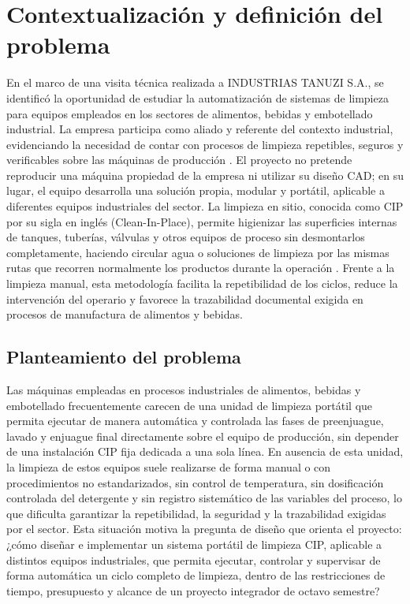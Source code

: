 \section{Contextualización y definición del problema}
{En el marco de una visita técnica realizada a INDUSTRIAS TANUZI S.A., se identificó la oportunidad de estudiar la automatización de sistemas de limpieza para equipos empleados en los sectores de alimentos, bebidas y embotellado industrial. La empresa participa como aliado y referente del contexto industrial, evidenciando la necesidad de contar con procesos de limpieza repetibles, seguros y verificables sobre las máquinas de producción \cite{bowser2023cip,pi_institucional}. El proyecto no pretende reproducir una máquina propiedad de la empresa ni utilizar su diseño CAD; en su lugar, el equipo desarrolla una solución propia, modular y portátil, aplicable a diferentes equipos industriales del sector. La limpieza en sitio, conocida como CIP por su sigla en inglés (Clean-In-Place), permite higienizar las superficies internas de tanques, tuberías, válvulas y otros equipos de proceso sin desmontarlos completamente, haciendo circular agua o soluciones de limpieza por las mismas rutas que recorren normalmente los productos durante la operación \cite{bowser2023cip}. Frente a la limpieza manual, esta metodología facilita la repetibilidad de los ciclos, reduce la intervención del operario y favorece la trazabilidad documental exigida en procesos de manufactura de alimentos y bebidas.}

\subsection{Planteamiento del problema}
{Las máquinas empleadas en procesos industriales de alimentos, bebidas y embotellado frecuentemente carecen de una unidad de limpieza portátil que permita ejecutar de manera automática y controlada las fases de preenjuague, lavado y enjuague final directamente sobre el equipo de producción, sin depender de una instalación CIP fija dedicada a una sola línea. En ausencia de esta unidad, la limpieza de estos equipos suele realizarse de forma manual o con procedimientos no estandarizados, sin control de temperatura, sin dosificación controlada del detergente y sin registro sistemático de las variables del proceso, lo que dificulta garantizar la repetibilidad, la seguridad y la trazabilidad exigidas por el sector. Esta situación motiva la pregunta de diseño que orienta el proyecto: ¿cómo diseñar e implementar un sistema portátil de limpieza CIP, aplicable a distintos equipos industriales, que permita ejecutar, controlar y supervisar de forma automática un ciclo completo de limpieza, dentro de las restricciones de tiempo, presupuesto y alcance de un proyecto integrador de octavo semestre?}

